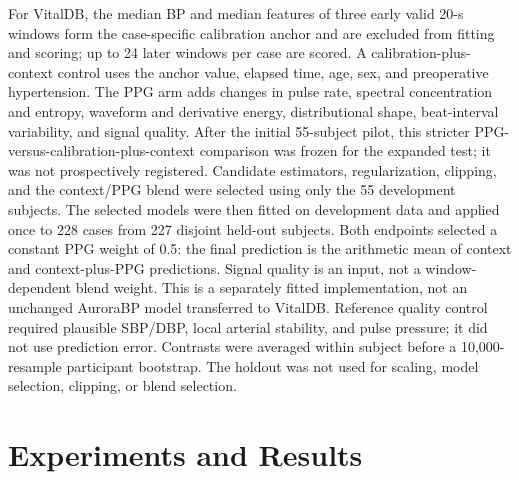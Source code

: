 \documentclass[journal]{IEEEtran}
\begin{document}
For VitalDB, the median BP and median features of three early valid 20-s windows form the case-specific calibration anchor and are excluded from fitting and scoring; up to 24 later windows per case are scored. A calibration-plus-context control uses the anchor value, elapsed time, age, sex, and preoperative hypertension. The PPG arm adds changes in pulse rate, spectral concentration and entropy, waveform and derivative energy, distributional shape, beat-interval variability, and signal quality. After the initial 55-subject pilot, this stricter PPG-versus-calibration-plus-context comparison was frozen for the expanded test; it was not prospectively registered. Candidate estimators, regularization, clipping, and the context/PPG blend were selected using only the 55 development subjects. The selected models were then fitted on development data and applied once to 228 cases from 227 disjoint held-out subjects. Both endpoints selected a constant PPG weight of 0.5: the final prediction is the arithmetic mean of context and context-plus-PPG predictions. Signal quality is an input, not a window-dependent blend weight. This is a separately fitted implementation, not an unchanged AuroraBP model transferred to VitalDB. Reference quality control required plausible SBP/DBP, local arterial stability, and pulse pressure; it did not use prediction error. Contrasts were averaged within subject before a 10{,}000-resample participant bootstrap. The holdout was not used for scaling, model selection, clipping, or blend selection.
\section{Experiments and Results}
\label{sec:results}
\end{document}
